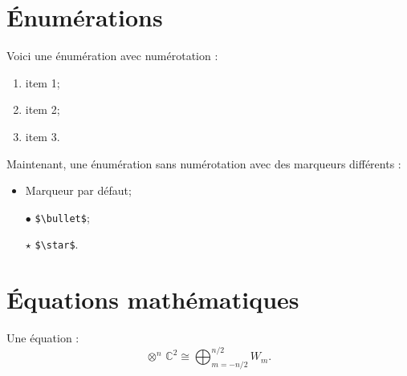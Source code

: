 \documentclass[12pt,maitrise,frenchb,natbib,twoside,initial]{dms}
\numberwithin{equation}{section}
\numberwithin{table}{chapter}
\numberwithin{figure}{chapter}
\begin{document}
\section{Énumérations}

Voici une énumération avec numérotation :
\begin{enumerate}
	\item item 1;
	\item item 2;
	\item item 3.
\end{enumerate}
Maintenant, une énumération sans numérotation avec des marqueurs différents :
\begin{itemize}
	\item Marqueur par défaut;
	\item[$\bullet$] \verb|$\bullet$|;
	\item[$\star$] \verb|$\star$|.
\end{itemize}


\section{Équations mathématiques}

Une équation :
\begin{equation*}
	\otimes^n\,\mathbb{C}^2 \cong \bigoplus_{m=-n/2}^{n/2} W_m.
\end{equation*}
\end{document}
